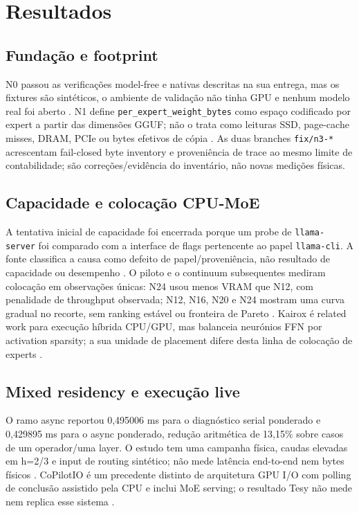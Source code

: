 \section{Resultados}
\subsection{Fundação e footprint}
N0 passou as verificações model-free e nativas descritas na sua entrega, mas os fixtures são sintéticos, o ambiente de validação não tinha GPU e nenhum modelo real foi aberto . N1 define \texttt{per\_expert\_weight\_bytes} como espaço codificado por expert a partir das dimensões GGUF; não o trata como leituras SSD, page-cache misses, DRAM, PCIe ou bytes efetivos de cópia . As duas branches \texttt{fix/n3-*} acrescentam fail-closed byte inventory e proveniência de trace ao mesmo limite de contabilidade; são correções/evidência do inventário, não novas medições físicas.

\subsection{Capacidade e colocação CPU-MoE}
A tentativa inicial de capacidade foi encerrada porque um probe de \texttt{llama-server} foi comparado com a interface de flags pertencente ao papel \texttt{llama-cli}. A fonte classifica a causa como defeito de papel/proveniência, não resultado de capacidade ou desempenho . O piloto e o continuum subsequentes mediram colocação em observações únicas: N24 usou menos VRAM que N12, com penalidade de throughput observada; N12, N16, N20 e N24 mostram uma curva gradual no recorte, sem ranking estável ou fronteira de Pareto  . Kairox é related work para execução híbrida CPU/GPU, mas balanceia neurónios FFN por activation sparsity; a sua unidade de placement difere desta linha de colocação de experts \cite{jiang2026kairox}.

\subsection{Mixed residency e execução live}
O ramo async reportou 0,495006 ms para o diagnóstico serial ponderado e 0,429895 ms para o async ponderado, redução aritmética de 13,15\% sobre casos de um operador/uma layer. O estudo tem uma campanha física, caudas elevadas em h=2/3 e input de routing sintético; não mede latência end-to-end nem bytes físicos . CoPilotIO é um precedente distinto de arquitetura GPU I/O com polling de conclusão assistido pela CPU e inclui MoE serving; o resultado Tesy não mede nem replica esse sistema \cite{chen2026copilotio}.

